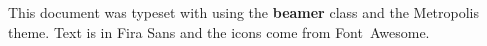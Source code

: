 \begin{frame}[plain]
  \begin{adjustwidth}{20mm}{20mm}
    \scriptsize \raggedright %
    This document was typeset with {\XeLaTeX} using the
    \textbf{beamer} class and the Metropolis theme. Text is in
    Fira Sans and the icons come from Font~Awesome.
  \end{adjustwidth}
\end{frame}

